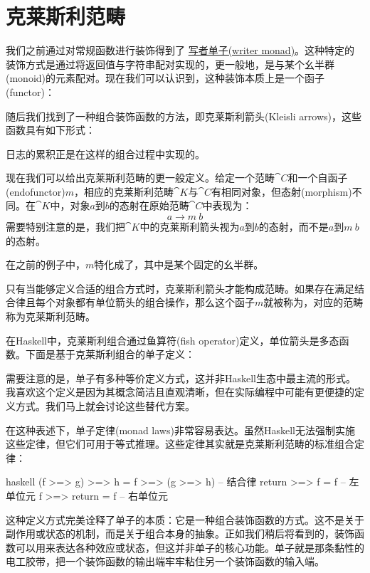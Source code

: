 \section{克莱斯利范畴}

我们之前通过对常规函数进行装饰得到了
\hyperref[kleisli-categories]{写者单子(writer monad)}。这种特定的装饰方式是通过将返回值与字符串配对实现的，更一般地，是与某个幺半群(monoid)的元素配对。现在我们可以认识到，这种装饰本质上是一个函子(functor)：

随后我们找到了一种组合装饰函数的方法，即克莱斯利箭头(Kleisli arrows)，这些函数具有如下形式：

日志的累积正是在这样的组合过程中实现的。

现在我们可以给出克莱斯利范畴的更一般定义。给定一个范畴$\cat{C}$和一个自函子(endofunctor)$m$，相应的克莱斯利范畴$\cat{K}$与$\cat{C}$有相同对象，但态射(morphism)不同。在$\cat{K}$中，对象$a$到$b$的态射在原始范畴$\cat{C}$中表现为：
$$a \to m\ b$$
需要特别注意的是，我们把$\cat{K}$中的克莱斯利箭头视为$a$到$b$的态射，而不是$a$到$m\ b$的态射。

在之前的例子中，$m$特化成了，其中是某个固定的幺半群。

只有当能够定义合适的组合方式时，克莱斯利箭头才能构成范畴。如果存在满足结合律且每个对象都有单位箭头的组合操作，那么这个函子$m$就被称为，对应的范畴称为克莱斯利范畴。

在Haskell中，克莱斯利组合通过鱼算符(fish operator)\code{>=>}定义，单位箭头是多态函数。下面是基于克莱斯利组合的单子定义：

需要注意的是，单子有多种等价定义方式，这并非Haskell生态中最主流的形式。我喜欢这个定义是因为其概念简洁且直观清晰，但在实际编程中可能有更便捷的定义方式。我们马上就会讨论这些替代方案。

在这种表述下，单子定律(monad laws)非常容易表达。虽然Haskell无法强制实施这些定律，但它们可用于等式推理。这些定律其实就是克莱斯利范畴的标准组合定律：

\begin{snip}{haskell}
(f >=> g) >=> h = f >=> (g >=> h) -- 结合律
return >=> f = f                  -- 左单位元
f >=> return = f                  -- 右单位元
\end{snip}
这种定义方式完美诠释了单子的本质：它是一种组合装饰函数的方式。这不是关于副作用或状态的机制，而是关于组合本身的抽象。正如我们稍后将看到的，装饰函数可以用来表达各种效应或状态，但这并非单子的核心功能。单子就是那条黏性的电工胶带，把一个装饰函数的输出端牢牢粘住另一个装饰函数的输入端。

